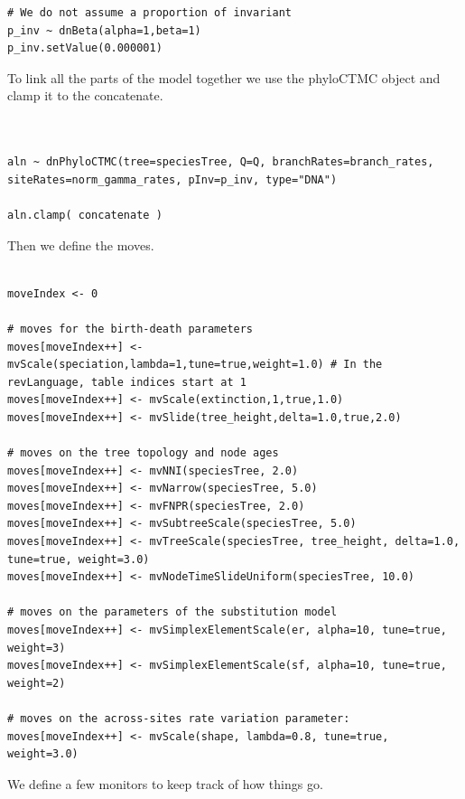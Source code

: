 \documentclass[11pt]{article}
\begin{document}
{\begin{framed}
{\begin{snugshade*}
\begin{lstlisting}
# We do not assume a proportion of invariant
p_inv ~ dnBeta(alpha=1,beta=1)
p_inv.setValue(0.000001)
\end{lstlisting}
\end{snugshade*}}

To link all the parts of the model together we use the phyloCTMC object and clamp it to the concatenate.

 {\tt \begin{snugshade*}
\begin{lstlisting}


aln ~ dnPhyloCTMC(tree=speciesTree, Q=Q, branchRates=branch_rates, siteRates=norm_gamma_rates, pInv=p_inv, type="DNA")

aln.clamp( concatenate )
\end{lstlisting}
\end{snugshade*}}

Then we define the moves.

 {\tt \begin{snugshade*}
\begin{lstlisting}

moveIndex <- 0

# moves for the birth-death parameters
moves[moveIndex++] <- mvScale(speciation,lambda=1,tune=true,weight=1.0) # In the revLanguage, table indices start at 1
moves[moveIndex++] <- mvScale(extinction,1,true,1.0)
moves[moveIndex++] <- mvSlide(tree_height,delta=1.0,true,2.0)

# moves on the tree topology and node ages
moves[moveIndex++] <- mvNNI(speciesTree, 2.0)
moves[moveIndex++] <- mvNarrow(speciesTree, 5.0)
moves[moveIndex++] <- mvFNPR(speciesTree, 2.0)
moves[moveIndex++] <- mvSubtreeScale(speciesTree, 5.0)
moves[moveIndex++] <- mvTreeScale(speciesTree, tree_height, delta=1.0, tune=true, weight=3.0)
moves[moveIndex++] <- mvNodeTimeSlideUniform(speciesTree, 10.0)

# moves on the parameters of the substitution model
moves[moveIndex++] <- mvSimplexElementScale(er, alpha=10, tune=true, weight=3) 
moves[moveIndex++] <- mvSimplexElementScale(sf, alpha=10, tune=true, weight=2) 

# moves on the across-sites rate variation parameter:
moves[moveIndex++] <- mvScale(shape, lambda=0.8, tune=true, weight=3.0)
\end{lstlisting}
\end{snugshade*}}

We define a few monitors to keep track of how things go.
 {\tt \begin{snugshade*}
\begin{lstlisting}


\end{lstlisting}
\end{snugshade*}}
\end{framed}}
\end{document}
